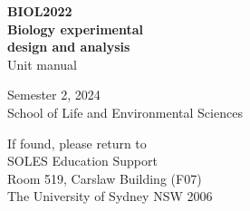 %
%
%
% 


	\RaggedRight
	

	
	
	
	
	{\Huge \textbf{BIOL2022}}\\[0.5\baselineskip]
	{\fontsize{38}{46}\selectfont \textbf{Biology experimental\\ design and analysis}}\\[\baselineskip]
	{\huge Unit manual}
	
	
	
	\vspace{0.05\textheight} %
	
	
	{\Large Semester 2, 2024\\[0.3\baselineskip]
	School of Life and Environmental Sciences}
	
	\vfill %
	
	
	
	\vfill

	{\normalsize If found, please return to\\
	SOLES Education Support\\
	Room 519, Carslaw Building (F07)\\
	The University of Sydney NSW 2006
	} 
	
	
	
	
	
